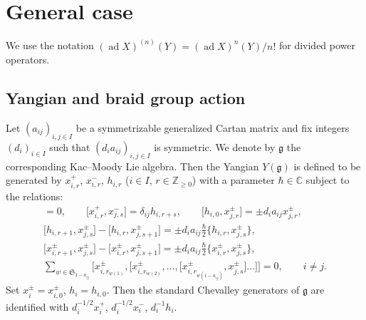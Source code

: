 \documentclass[pdftex]{sigma}
\theoremstyle{definition}
\numberwithin{equation}{section}
\DeclareMathOperator{\ad}{ad}
\newcommand{\bbC}{\mathbb{C}}
\newcommand{\frakg}{\mathfrak{g}}
\begin{document}
\appendix
\section{General case}\label{appendixA}
We use the notation $(\ad X)^{(n)}(Y) = (\ad X)^{n}(Y) / n!$ for divided power operators.

\subsection{Yangian and braid group action}

Let $(a_{ij})_{i,j \in I}$ be a symmetrizable generalized Cartan matrix and fix integers $(d_i)_{i \in I}$ such that $(d_i a_{ij})_{i,j \in I}$ is symmetric. We denote by $\frakg$ the corresponding Kac--Moody Lie algebra. Then the Yangian $Y(\frakg)$ is defined to be generated by $x_{i,r}^{+}$, $x_{i,r}^{-}$, $h_{i,r}$ ($i \in I$, $r \in \mathbb{Z}_{\geq 0}$) with a parameter $\hbar \in \bbC$ subject to the relations:
\begin{gather*}
[h_{i,r}, h_{j,s}] = 0, \qquad \big[x_{i,r}^{+}, x_{j,s}^{-}\big] = \delta_{ij} h_{i, r+s}, \qquad \big[h_{i,0}, x_{j,r}^{\pm}\big] = \pm d_i a_{ij} x_{j,r}^{\pm},\\
\big[h_{i, r+1}, x_{j, s}^{\pm}\big] - \big[h_{i, r}, x_{j, s+1}^{\pm}\big] = \pm d_i a_{ij} \tfrac{\hbar}{2} \big\{h_{i, r}, x_{j, s}^{\pm}\big\},\\
\big[x_{i, r+1}^{\pm}, x_{j, s}^{\pm}\big] - \big[x_{i, r}^{\pm}, x_{j, s+1}^{\pm}\big] = \pm d_i a_{ij}\tfrac{\hbar}{2} \big\{x_{i, r}^{\pm}, x_{j, s}^{\pm}\big\},\\
\sum_{w \in \mathfrak{S}_{1 - a_{ij}}}\big[x_{i,r_{w(1)}}^{\pm}, \big[x_{i,r_{w(2)}}^{\pm}, \dots, \big[x_{i,r_{w(1 - a_{ij})}}^{\pm}, x_{j,s}^{\pm}\big]\dots\big]\big] = 0, \qquad i \neq j.
\end{gather*}
Set $x_{i}^{\pm} = x_{i,0}^{\pm}$, $h_{i} = h_{i,0}$. Then the standard Chevalley generators of $\frakg$ are identified with $d_i^{-1/2} x_i^+$, $d_i^{-1/2} x_i^-$, $d_i^{-1}h_i$.
\end{document}
